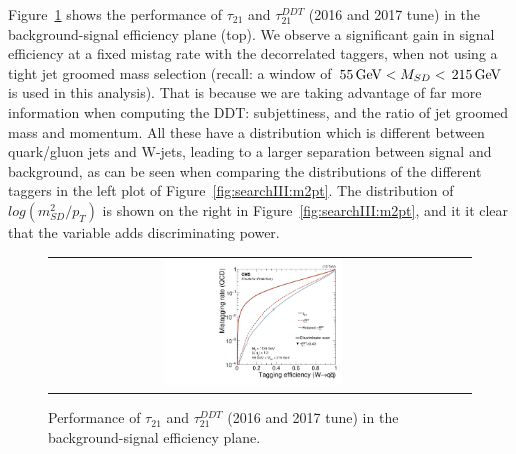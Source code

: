 Figure~\ref{fig:searchIII:roc} shows the performance of $\tau_{21}$ and $\tau_{21}^{DDT}$ (2016 and 2017 tune) in the background-signal efficiency plane (top). We observe a significant gain in signal efficiency at a fixed mistag rate with the decorrelated taggers, when not using a tight jet groomed mass selection (recall: a window of $\text{\,55}{\ensuremath{\,\text{Ge\hspace{-.08em}V}}} < M_{SD} < \text{\,215}{\ensuremath{\,\text{Ge\hspace{-.08em}V}}}$ is used in this analysis). That is because we are taking advantage of far more information when computing the DDT: subjettiness, and the ratio of jet groomed mass and momentum. All these have a distribution which is different between quark/gluon jets and W-jets, leading to a larger separation between signal and background, as can be seen when comparing the distributions of the different taggers in the left plot of Figure~\ref{fig:searchIII:m2pt}. The distribution of $log(m_{SD}^2/p_T)$ is shown on the right in Figure~\ref{fig:searchIII:m2pt}, and it it clear that the variable adds discriminating power.
\begin{figure}[h!]
\centering
\begin{tabular}{cc}
\includegraphics[width=0.45\textwidth]{figures/analysis/search3/AN-17-303/vtag/rocTau21s.pdf}
\end{tabular}
\caption{Performance of $\tau_{21}$ and $\tau_{21}^{DDT}$ (2016 and 2017 tune) in the background-signal efficiency plane.}
\label{fig:searchIII:roc}
\end{figure}

